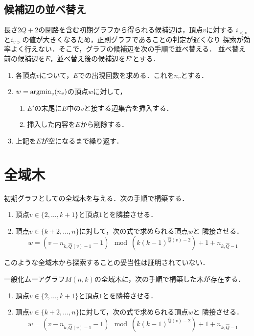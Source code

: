 \subsection*{候補辺の並べ替え}
長さ$2Q+2$の閉路を含む初期グラフから得られる候補辺は，頂点$v$に対する
$i_{<v}$と$i_{v>}$の値が大きくなるため，正則グラフであることの判定が遅くなり
探索が効率よく行えない．そこで，グラフの候補辺を次の手順で並べ替える．
並べ替え前の候補辺を$E$，並べ替え後の候補辺を$E'$とする．
\begin{enumerate}
\item 各頂点$v$について，$E$での出現回数を求める．これを$n_v$とする．
\item $w=\operatorname*{\arg\!\min}_{v}(n_v)$の頂点$w$に対して，
  \begin{enumerate}
  \item $E'$の末尾に$E$中の$v$と接する辺集合を挿入する．
  \item 挿入した内容を$E$から削除する．
  \end{enumerate}
\item 上記を$E$が空になるまで繰り返す．
\end{enumerate}

\section{全域木}
\label{sect:initial-spanning-tree}
初期グラフとしての全域木を与える．次の手順で構築する．
\begin{enumerate}
\item 頂点$v\in\{2,\ldots,k+1\}$と頂点$1$とを隣接させる．
\item 頂点$v\in\{k+2,\ldots,n\}$に対して，次の式で求められる頂点$w$と
  隣接させる．
  \[ w=(v-n_{k,\hat{Q}(v)-1}-1)\mod(k(k-1)^{\hat{Q}(v)-2})+1+n_{k,\hat{Q}-1} \]
\end{enumerate}
このような全域木から探索することの妥当性は証明されていない．
\begin{conjecture}
  \label{conj:spanning-tree}
  一般化ムーアグラフ$M(n,k)$の全域木に，次の手順で構築した木が存在する．
  \begin{enumerate}
  \item 頂点$v\in\{2,\ldots,k+1\}$と頂点$1$とを隣接させる．
  \item 頂点$v\in\{k+2,\ldots,n\}$に対して，次の式で求められる頂点$w$と
    隣接させる．
    \[w=(v-n_{k,\hat{Q}(v)-1}-1)\mod(k(k-1)^{\hat{Q}(v)-2})+1+n_{k,\hat{Q}-1}\]
  \end{enumerate}
\end{conjecture}

